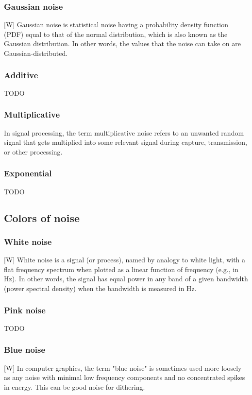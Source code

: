\documentclass[12pt]{article}
\begin{document}
	\subsubsection{Gaussian noise}
	[W] Gaussian noise is statistical noise having a probability density function (PDF) equal to 
	that of the normal distribution, which is also known as the Gaussian distribution. In other
	words, the values that the noise can take on are Gaussian-distributed.
	
	\subsubsection{Additive}
	TODO
	\subsubsection{Multiplicative}
	In signal processing, the term multiplicative noise refers to an unwanted random signal that 
	gets multiplied into some relevant signal during capture, transmission, or other processing.
	\subsubsection{Exponential}
	TODO
	
	\subsection{Colors of noise}
	\subsubsection{White noise}
	[W] White noise is a signal (or process), named by analogy to white light, with a flat frequency
	spectrum when plotted as a linear function of frequency (e.g., in Hz). In other words, the signal 
	has equal power in any band of a given bandwidth (power spectral density) when the bandwidth is 
	measured in Hz. 
	\subsubsection{Pink noise}
	TODO
	\subsubsection{Blue noise}
	[W] In computer graphics, the term "blue noise" is sometimes used more loosely as any noise with 
	minimal low frequency components and no concentrated spikes in energy. This can be good noise for dithering.
%	
%	
\end{document}
